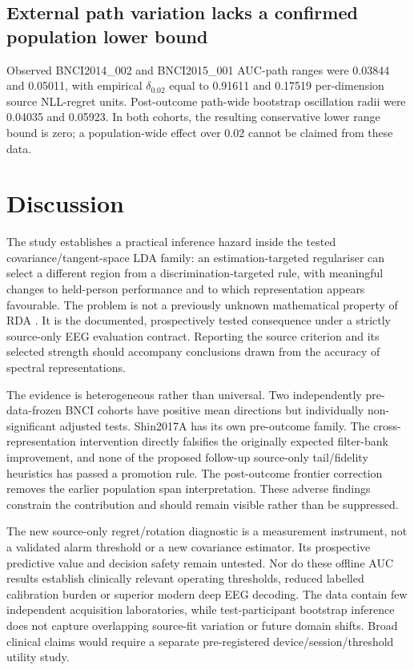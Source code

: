 \documentclass[11pt,a4paper]{article}
\begin{document}
\subsection{External path variation lacks a confirmed population lower bound}
Observed BNCI2014\_002 and BNCI2015\_001 AUC-path ranges were
0.03844 and 0.05011, with empirical \(\delta_{0.02}\) equal
to 0.91611 and 0.17519 per-dimension source NLL-regret units.
Post-outcome path-wide bootstrap oscillation radii were 0.04035
and 0.05923. In both cohorts, the resulting conservative
lower range bound is zero; a population-wide effect over 0.02
cannot be claimed from these data.







\section{Discussion}
The study establishes a practical inference hazard inside the tested
covariance/tangent-space LDA family: an estimation-targeted regulariser
can select a different region from a discrimination-targeted rule, with
meaningful changes to held-person performance and to which
representation appears favourable. The problem is not a previously
unknown mathematical property of RDA \cite{friedman1989}.
It is the documented, prospectively tested consequence under a strictly
source-only EEG evaluation contract. Reporting the source criterion and
its selected strength should accompany conclusions drawn from the
accuracy of spectral representations.

The evidence is heterogeneous rather than universal. Two independently
pre-data-frozen BNCI cohorts have positive mean directions but individually
non-significant adjusted tests. Shin2017A has its own pre-outcome family.
The cross-representation intervention directly falsifies the originally
expected filter-bank improvement, and none of the proposed follow-up
source-only tail/fidelity heuristics has passed a promotion rule.
The post-outcome frontier correction removes the earlier population
span interpretation. These adverse findings constrain the contribution
and should remain visible rather than be suppressed.

The new source-only regret/rotation diagnostic is a measurement instrument,
not a validated alarm threshold or a new covariance estimator. Its
prospective predictive value and decision safety remain untested. Nor do
these offline AUC results establish clinically relevant operating thresholds,
reduced labelled calibration burden or superior modern deep EEG decoding.
The data contain few independent acquisition laboratories, while
test-participant bootstrap inference does not capture overlapping
source-fit variation or future domain shifts. Broad clinical claims
would require a separate pre-registered device/session/threshold utility study.
\end{document}
